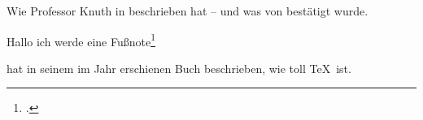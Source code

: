 \documentclass[12pt,ngerman,parskip=full]{scrartcl}
\begin{document}
\blinddocument

Wie Professor Knuth in \cite{Duck2023} beschrieben hat -- und was von \cite{Knuth1984} bestätigt wurde.

\cite{Cao2021}

\parencite{Knuth1984}

Hallo ich werde eine Fußnote\footcite{Knuth1984}

\citeauthor{Knuth1984} hat in seinem im Jahr \citeyear{Knuth1984} erschienen Buch  beschrieben, wie toll \TeX\ ist.


\printbibliography %

\printbibliography[title={Artikel},type=article]

\printbibliography[title={Bücher},type=book]
\end{document}
